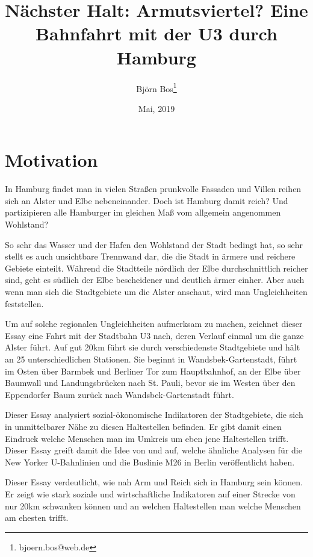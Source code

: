 \documentclass[10pt,a4paper]{article}
\begin{document}
\author{Björn Bos\thanks{bjoern.bos@web.de}}
\title{Nächster Halt: Armutsviertel? Eine Bahnfahrt mit der U3 durch Hamburg}
\date{Mai, 2019}

\maketitle

\doublespacing

\section*{Motivation}
In Hamburg findet man in vielen Straßen prunkvolle Fassaden und Villen reihen sich an Alster und Elbe nebeneinander. Doch ist Hamburg damit reich? Und partizipieren alle Hamburger im gleichen Maß vom allgemein angenommen Wohlstand?

So sehr das Wasser und der Hafen den Wohlstand der Stadt bedingt hat, so sehr stellt es auch unsichtbare Trennwand dar, die die Stadt in ärmere und reichere Gebiete einteilt. Während die Stadtteile nördlich der Elbe durchschnittlich reicher sind, geht es südlich der Elbe bescheidener und deutlich ärmer einher. Aber auch wenn man sich die Stadtgebiete um die Alster anschaut, wird man Ungleichheiten feststellen.

Um auf solche regionalen Ungleichheiten aufmerksam zu machen, zeichnet dieser Essay eine Fahrt mit der Stadtbahn U3 nach, deren Verlauf einmal um die ganze Alster führt. Auf gut 20km führt sie durch verschiedenste Stadtgebiete und hält an 25 unterschiedlichen Stationen. Sie beginnt in Wandsbek-Gartenstadt, führt im Osten über Barmbek und Berliner Tor zum Hauptbahnhof, an der Elbe über Baumwall und Landungsbrücken nach St. Pauli, bevor sie im Westen über den Eppendorfer Baum zurück nach Wandsbek-Gartenstadt führt.

Dieser Essay analysiert sozial-ökonomische Indikatoren der Stadtgebiete, die sich in unmittelbarer Nähe zu diesen Haltestellen befinden. Er gibt damit einen Eindruck welche Menschen man im Umkreis um eben jene Haltestellen trifft. Dieser Essay greift damit die Idee von \citet{New_Yorker} und \citet{M29} auf, welche ähnliche Analysen für die New Yorker U-Bahnlinien und die Buslinie M26 in Berlin veröffentlicht haben.

Dieser Essay verdeutlicht, wie nah Arm und Reich sich in Hamburg sein können. Er zeigt wie stark soziale und wirtschaftliche Indikatoren auf einer Strecke von nur 20km schwanken können und an welchen Haltestellen man welche Menschen am ehesten trifft.
\end{document}
